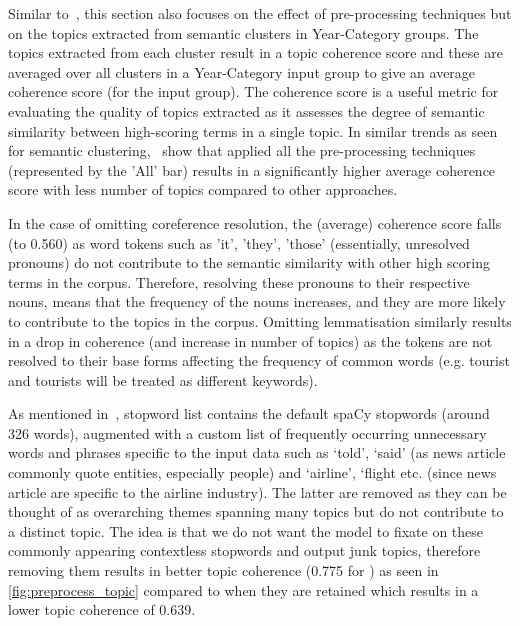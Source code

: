 \vspace*{-1em}
 Similar to~, this section also focuses on the effect of pre-processing techniques but on the topics extracted from semantic clusters in Year-Category groups. The topics extracted from each cluster result in a topic coherence score and these are averaged over all clusters in a Year-Category input group to give an average coherence score (for the input group). The coherence score is a useful metric for evaluating the quality of topics extracted as it assesses the degree of semantic similarity between high-scoring terms in a single topic. In similar trends as seen for semantic clustering,~ show that applied all the pre-processing techniques (represented by the 'All' bar) results in a significantly higher average coherence score with less number of topics compared to other approaches.  

In the case of omitting coreference resolution, the (average) coherence score falls (to 0.560) as word tokens such as 'it', 'they', 'those' (essentially, unresolved pronouns) do not contribute to the semantic similarity with other high scoring terms in the corpus. Therefore, resolving these pronouns to their respective nouns, means that the frequency of the nouns increases, and they are more likely to contribute to the topics in the corpus. Omitting lemmatisation similarly results in a drop in coherence (and increase in number of topics) as the tokens are not resolved to their base forms affecting the frequency of common words (e.g. tourist and tourists will be treated as different keywords).

As mentioned in~, stopword list contains the default spaCy stopwords (around 326 words), augmented with a custom list of frequently occurring unnecessary words and phrases specific to the input data such as `told', `said' (as news article commonly quote entities, especially people) and `airline', `flight etc. (since news article are specific to the airline industry). The latter are removed as they can be thought of as overarching themes spanning many topics but do not contribute to a distinct topic. The idea is that we do not want the model to fixate on these commonly appearing contextless stopwords and output junk topics, therefore removing them results in better topic coherence (0.775 for ) as seen in \ref{fig:preprocess_topic} compared to when they are retained which results in a lower topic coherence of 0.639.


